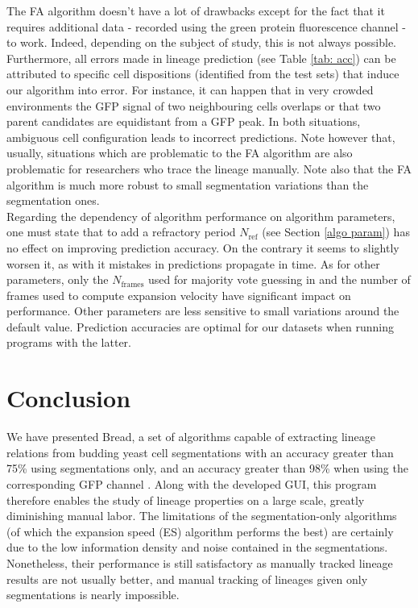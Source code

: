 \documentclass{TP}
\begin{document}
The FA algorithm doesn't have  a lot of drawbacks except for the fact that it requires additional data - recorded using the green protein fluorescence channel - to work. Indeed, depending on the subject of study, this is not always possible. Furthermore, all errors made in lineage prediction (see Table \ref{tab: acc}) can be attributed to specific cell dispositions (identified from the test sets) that induce our algorithm into error. For instance, it can happen that in very crowded environments the GFP signal of two neighbouring cells overlaps or that two parent candidates are equidistant from a GFP peak. In both situations, ambiguous cell configuration leads to incorrect predictions. Note however that, usually, situations which are problematic to the FA algorithm are also problematic for researchers who trace the lineage manually. Note also that the FA algorithm is much more robust to small segmentation variations than the segmentation ones. \\

Regarding the dependency of algorithm performance on algorithm parameters, one must state that to add a refractory period $N_{\text{ref}}$ (see Section \ref{algo param}) has no effect on improving prediction accuracy. On the contrary it seems to slightly worsen it, as with it mistakes in predictions propagate in time. As for other parameters, only the $N_{\text{frames}}$ used for majority vote guessing in and the number of frames used to compute expansion velocity have significant impact on performance. Other parameters are less sensitive to small variations around the default value. Prediction accuracies are optimal for our datasets when running programs with the latter.



\section{Conclusion}
\label{Conclusion}

We have presented Bread, a set of algorithms capable of extracting lineage relations from budding yeast cell segmentations with an accuracy greater than 75\% using segmentations only, and an accuracy greater than 98\%  when using the corresponding GFP channel \cite{lien github}. Along with the developed GUI, this program therefore enables the study of lineage properties on a large scale, greatly diminishing manual labor. The limitations of the segmentation-only algorithms (of which the expansion speed (ES) algorithm performs the best) are certainly due to the low information density and noise contained in the segmentations. Nonetheless, their performance is still satisfactory as manually tracked lineage results are not usually better, and manual tracking of lineages given only segmentations is nearly impossible.
\end{document}
